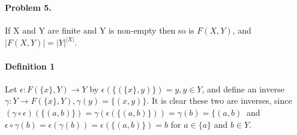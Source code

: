 \documentclass[12pt, letterpaper]{article}
\begin{document}
 \\

\paragraph{Problem 5.} If X and Y are finite and Y is non-empty then
so is \(F(X, Y)\), and \(|F(X, Y)| = |Y|^{|X|}\).

\paragraph{Definition 1} Let \(\epsilon: F(\{x\}, Y) \rightarrow Y\) by \(\epsilon(\{(\{x\},y)\} ) = y, y \in Y\), and define an inverse \(\gamma: Y \rightarrow F(\{x\}, Y), \gamma(y) = \{(x, y)\}\). It is clear these two are inverses, since \( (\gamma \circ \epsilon)(\{(a, b)\}) = \gamma(\epsilon(\{(a, b)\})) = \gamma(b) = \{(a, b)\ \) and \(\epsilon \circ \gamma(b) = \epsilon(\gamma(b)) = \epsilon(\{(a,b)\}) = b\) for \(a \in \{a\}\) and \(b \in Y\).
\end{document}
